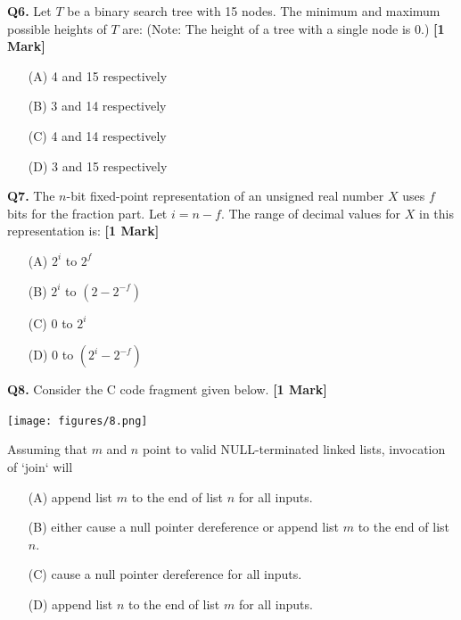 \documentclass[11pt]{article}
\newcommand{\questiona}[2]{
    \noindent\textbf{Q#2.} #1 \hfill \textbf{[1 Mark]}
}
\begin{document}
\questiona{Let \( T \) be a binary search tree with 15 nodes. The minimum and maximum possible heights of \( T \) are:  
(Note: The height of a tree with a single node is 0.)}{6}
\begin{enumerate}
    \item[(A)] 4 and 15 respectively  
    \item[(B)] 3 and 14 respectively  
    \item[(C)] 4 and 14 respectively  
    \item[(D)] 3 and 15 respectively  
\end{enumerate}
\vspace{0.5cm}

\questiona{The \( n \)-bit fixed-point representation of an unsigned real number \( X \) uses \( f \) bits for the fraction part. Let \( i = n - f \). The range of decimal values for \( X \) in this representation is:}{7}
\begin{enumerate}
    \item[(A)] \( 2^i \) to \( 2^f \)  
    \item[(B)] \( 2^i \) to \( (2 - 2^{-f}) \)  
    \item[(C)] \( 0 \) to \( 2^i \)  
    \item[(D)] \( 0 \) to \( (2^i - 2^{-f}) \)  
\end{enumerate}
\vspace{0.5cm}

\questiona{Consider the C code fragment given below.}{8}
\begin{center}
\texttt{[image: figures/8.png]}
\end{center}
Assuming that \( m \) and \( n \) point to valid NULL-terminated linked lists, invocation of `join` will
\begin{enumerate}
    \item[(A)] append list \( m \) to the end of list \( n \) for all inputs.  
    \item[(B)] either cause a null pointer dereference or append list \( m \) to the end of list \( n \).  
    \item[(C)] cause a null pointer dereference for all inputs.  
    \item[(D)] append list \( n \) to the end of list \( m \) for all inputs.  
\end{enumerate}
\vspace{0.5cm}
\end{document}
